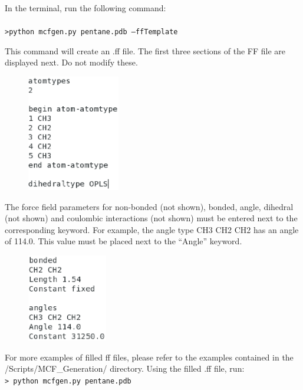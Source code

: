 In the terminal, run the following command:\\ \\
\texttt{>python mcfgen.py pentane.pdb --ffTemplate}

This command will create an .ff file. The first three sections of the FF file are displayed next. 
Do not modify these.

\begin{figure}[h]
\begin{center}
\includegraphics[height=2in]{top_ff.eps}
\end{center}
\end{figure}

The force field parameters for non-bonded (not shown), bonded, angle, dihedral (not shown)
and coulombic interactions (not shown) must be entered next to the corresponding keyword.
For example, the angle type CH3 CH2 CH2 has an angle of 114.0. This value must be placed
next to the ``Angle'' keyword.

\begin{figure}[h]
\begin{center}
\includegraphics[height=1.5in]{body_ff.eps}
\end{center}
\end{figure}

\vspace{3in}
For more examples of filled ff files, please refer to the examples contained in the /Scripts/MCF\_Generation/ directory. Using the
filled .ff file, run: \\

\texttt{> python mcfgen.py pentane.pdb} \\

